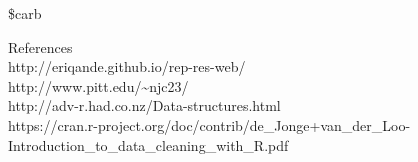 \documentclass[11pt]{article}
\begin{document}
\begin{description}
\item[\$carb] 

\end{description}


    
    {References}\\
http://eriqande.github.io/rep-res-web/\\
http://www.pitt.edu/\textasciitilde{}njc23/\\
http://adv-r.had.co.nz/Data-structures.html\\
https://cran.r-project.org/doc/contrib/de\_Jonge+van\_der\_Loo-Introduction\_to\_data\_cleaning\_with\_R.pdf


    
    
    
    
\end{document}
